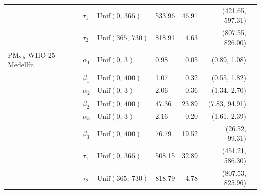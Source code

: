 \begin{longtable}{llllrrr}
 & $\tau_{1}$ & $\text{Unif}(0,\,365)$ & 533.96 & 46.91 & (421.65, 597.31) \\
 & $\tau_{2}$ & $\text{Unif}(365,\,730)$ & 818.91 & 4.63 & (807.55, 826.00) \\
\midrule
PM$_{2.5}$ WHO 25 --- Medell\'{i}n & $\alpha_{1}$ & $\text{Unif}(0,\,3)$ & 0.98 & 0.05 & (0.89, 1.08) \\
 & $\beta_{1}$ & $\text{Unif}(0,\,400)$ & 1.07 & 0.32 & (0.55, 1.82) \\
 & $\alpha_{2}$ & $\text{Unif}(0,\,3)$ & 2.06 & 0.36 & (1.34, 2.70) \\
 & $\beta_{2}$ & $\text{Unif}(0,\,400)$ & 47.36 & 23.89 & (7.83, 94.91) \\
 & $\alpha_{3}$ & $\text{Unif}(0,\,3)$ & 2.16 & 0.20 & (1.61, 2.39) \\
 & $\beta_{3}$ & $\text{Unif}(0,\,400)$ & 76.79 & 19.52 & (26.52, 99.31) \\
 & $\tau_{1}$ & $\text{Unif}(0,\,365)$ & 508.15 & 32.89 & (451.21, 586.30) \\
 & $\tau_{2}$ & $\text{Unif}(365,\,730)$ & 818.79 & 4.78 & (807.53, 825.96) \\
\end{longtable}
